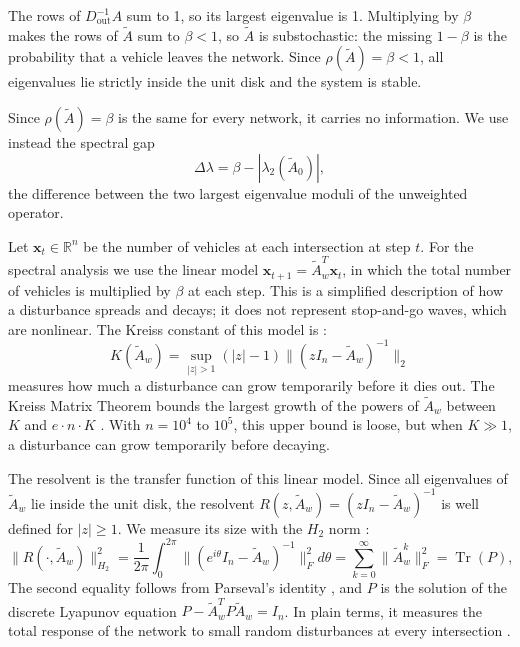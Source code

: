 \documentclass[journal]{IEEEtran}
\begin{document}
The rows of $D_{\text{out}}^{-1} A$ sum to 1, so its largest eigenvalue is 1. Multiplying by $\beta$ makes the rows of $\tilde{A}$ sum to $\beta < 1$, so $\tilde{A}$ is substochastic: the missing $1 - \beta$ is the probability that a vehicle leaves the network. Since $\rho(\tilde{A}) = \beta < 1$, all eigenvalues lie strictly inside the unit disk and the system is stable.

Since $\rho(\tilde{A}) = \beta$ is the same for every network, it carries no information. We use instead the spectral gap
\begin{equation}
\Delta\lambda = \beta - |\lambda_2(\tilde{A}_0)|,
\label{eq:spectral_gap}
\end{equation}
the difference between the two largest eigenvalue moduli of the unweighted operator.

Let $\mathbf{x}_t \in \mathbb{R}^n$ be the number of vehicles at each intersection at step $t$. For the spectral analysis we use the linear model $\mathbf{x}_{t+1} = \tilde{A}_w^T \mathbf{x}_t$, in which the total number of vehicles is multiplied by $\beta$ at each step. This is a simplified description of how a disturbance spreads and decays; it does not represent stop-and-go waves, which are nonlinear. The Kreiss constant of this model is \cite{Kreiss1962}:
\begin{equation}
K(\tilde{A}_w) = \sup_{|z| > 1} (|z| - 1) \| (z I_n - \tilde{A}_w)^{-1} \|_2
\label{eq:kreiss}
\end{equation}
measures how much a disturbance can grow temporarily before it dies out. The Kreiss Matrix Theorem \cite{Kreiss1962} bounds the largest growth of the powers of $\tilde{A}_w$ between $K$ and $e \cdot n \cdot K$ \cite{Spijker1991}. With $n = 10^4$ to $10^5$, this upper bound is loose, but when $K \gg 1$, a disturbance can grow temporarily before decaying.

The resolvent is the transfer function of this linear model. Since all eigenvalues of $\tilde{A}_w$ lie inside the unit disk, the resolvent $R(z, \tilde{A}_w) = (z I_n - \tilde{A}_w)^{-1}$ is well defined for $|z| \ge 1$. We measure its size with the $H_2$ norm \cite{Zhou1996, Bamieh2012}:
\begin{equation}
\| R(\cdot, \tilde{A}_w) \|_{H_2}^2 = \frac{1}{2\pi} \int_0^{2\pi} \|(e^{i\theta} I_n - \tilde{A}_w)^{-1}\|_F^2 d\theta = \sum_{k=0}^\infty \| \tilde{A}_w^k \|_F^2 = \operatorname{Tr}(P),
\label{eq:hardy_lyapunov}
\end{equation}
The second equality follows from Parseval's identity \cite{Zhou1996}, and $P$ is the solution of the discrete Lyapunov equation $P - \tilde{A}_w^T P \tilde{A}_w = I_n$. In plain terms, it measures the total response of the network to small random disturbances at every intersection \cite{Bamieh2012, Siami2016}.
\end{document}
